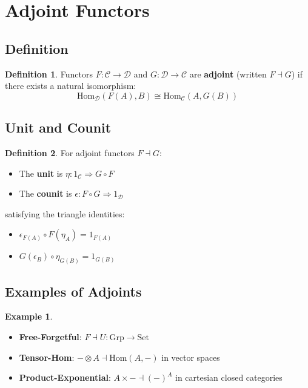 \documentclass[11pt]{article}
\theoremstyle{definition}
\newtheorem{definition}{Definition}[section]
\newtheorem{example}{Example}[section]
\begin{document}
\section{Adjoint Functors}

\subsection{Definition}
\begin{definition}
Functors $F: \mathcal{C} \to \mathcal{D}$ and $G: \mathcal{D} \to \mathcal{C}$ are \textbf{adjoint} (written $F \dashv G$) if there exists a natural isomorphism:
$$\text{Hom}_{\mathcal{D}}(F(A), B) \cong \text{Hom}_{\mathcal{C}}(A, G(B))$$
\end{definition}

\subsection{Unit and Counit}
\begin{definition}
For adjoint functors $F \dashv G$:
\begin{itemize}
    \item The \textbf{unit} is $\eta: 1_{\mathcal{C}} \Rightarrow G \circ F$
    \item The \textbf{counit} is $\epsilon: F \circ G \Rightarrow 1_{\mathcal{D}}$
\end{itemize}
satisfying the triangle identities:
\begin{itemize}
    \item $\epsilon_{F(A)} \circ F(\eta_A) = 1_{F(A)}$
    \item $G(\epsilon_B) \circ \eta_{G(B)} = 1_{G(B)}$
\end{itemize}
\end{definition}

\subsection{Examples of Adjoints}
\begin{example}
\begin{itemize}
    \item \textbf{Free-Forgetful}: $F \dashv U: \text{Grp} \to \text{Set}$
    \item \textbf{Tensor-Hom}: $-\otimes A \dashv \text{Hom}(A,-)$ in vector spaces
    \item \textbf{Product-Exponential}: $A \times - \dashv (-)^A$ in cartesian closed categories
\end{itemize}
\end{example}
\end{document}
